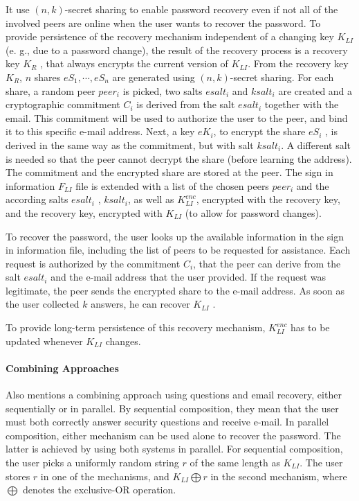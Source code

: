  It use $(n, k)$-secret sharing to enable password recovery even
 if not all of the involved peers are online when the user wants
 to recover the password.
 To provide persistence of the recovery mechanism independent of a changing key $K_{LI}$ (e. g., due to a password change),
 the result of the recovery process is a recovery key $K_R$ ,
 that always encrypts the current version of $K_{LI}$.
  From the recovery key $K_R$, $n$
 shares $eS_1, \cdots, eS_n$ are generated using $(n, k)$-secret sharing.
 For each share, a random peer $peer_i$ is picked, two salts $esalt_i$
 and $ksalt_i$ are created and a cryptographic commitment $C_i$ is
 derived from the salt $esalt_i$ together with the email. This
 commitment will be used to authorize the user to the peer,
 and bind it to this specific e-mail address. Next, a key $eK_i$,
 to encrypt the share $eS_i$ , is derived in the same way as the
 commitment, but with salt $ksalt_i$. A different salt is needed
 so that the peer cannot decrypt the share (before learning the
 address). The commitment and the encrypted share are stored
 at the peer. The sign in information $F_{LI}$ file is extended with a
 list of the chosen peers $peer_i$ and the according salts $esalt_i$ ,
 $ksalt_i$, as well as $K_{LI}^{enc}$, encrypted with the recovery key, and
 the recovery key, encrypted with $K_{LI}$ (to allow for password
 changes).

 To recover the password, the user looks up the
 available information in the sign in information file, including
 the list of peers to be requested for assistance. Each request is
 authorized by the commitment $C_i$, that the peer can derive
 from the salt $esalt_i$ and the e-mail address that the user
 provided. If the request was legitimate, the peer
 sends the encrypted share to the e-mail address. As soon as
 the user collected $k$ answers, he can recover $K_{LI}$ .

 To provide long-term persistence of this recovery mechanism, $K_{LI}^{enc}$
 has to be updated whenever $K_{LI}$ changes.
 
 \paragraph{Combining Approaches}
 Also mentions a combining approach using questions and email recovery, either
sequentially or in parallel.
  By sequential composition, they mean
 that the user must both correctly answer security questions and
 receive e-mail. In parallel composition, either
 mechanism can be used alone to recover the password. The
 latter is achieved by using both systems in parallel.
 For sequential composition, the user picks a uniformly
 random string $r$ of the same length as $K_{LI}$. The user stores $r$ in
one of the mechanisms, and $K_{LI} \bigoplus r$ in the second mechanism, where
$\bigoplus $ denotes the exclusive-OR operation.

